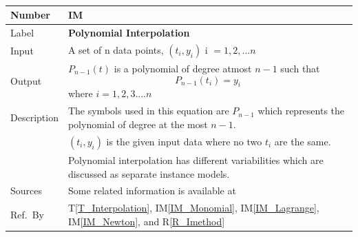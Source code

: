 \documentclass[12pt]{article}
\newcommand{\colAwidth}{0.13\textwidth}
\newcommand{\colBwidth}{0.82\textwidth}
\newcommand{\tref}[1]{T\ref{#1}}
\newcounter{instnum} %
\newcommand{\iref}[1]{IM\ref{#1}}
\newcommand{\rref}[1]{R\ref{#1}}
\begin{document}
~\newline
\noindent
\begin{minipage}{\textwidth}
	\renewcommand*{\arraystretch}{1.5}
	\begin{tabular}{| p{\colAwidth} | p{\colBwidth}|}
		\hline
		\rowcolor[gray]{0.9}
		Number
		& IM{instnum}\theinstnum \label{IM_Polynomial}\\
		\hline
		
		Label
		& \bf Polynomial Interpolation\\
		\hline
		
		Input
		& A set of n data points, $(t_i,y_i)$ i $= {1,2,...n}$\\		
		\hline
		
		Output& $P_{n-1}(t)$ is a polynomial of degree atmost $n-1$ such that 
		\begin{equation*}
		P_{n-1}(t_i) = y_i
		\end{equation*}
		where $i = 1,2,3 ....n$
		\\
		\hline
		
		Description 
		& The symbols used in this equation are $P_{n-1}$ which represents the polynomial of degree at the most $n-1$.\\
		& $(t_i,y_i)$ is the given input data where no two $t_i$ are the same.\\
		&Polynomial interpolation has different variabilities which are discussed as separate instance models.\\
		\hline
		
		Sources
		& Some related information is available at ~\cite{PolyInterpolation}\\
		\hline
		Ref.\ By & \tref{T_Interpolation}, \iref{IM_Monomial}, \iref{IM_Lagrange}, \iref{IM_Newton}, and \rref{R_Imethod}\\
		\hline
	\end{tabular}
\end{minipage}\\

\end{document}
